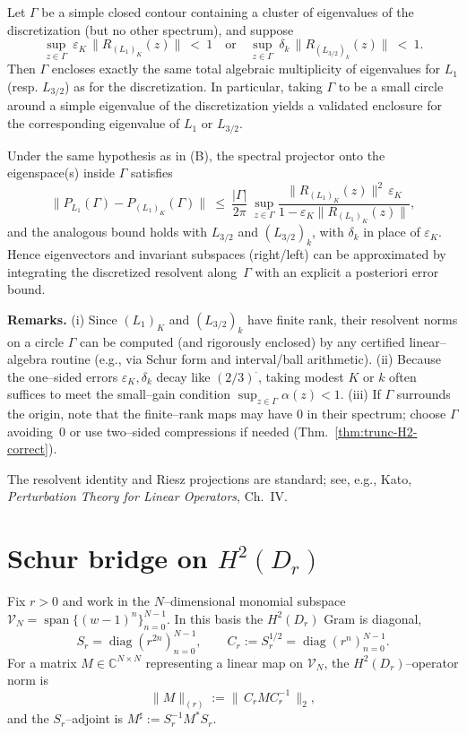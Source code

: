 \documentclass[11pt]{article}
\begin{document}
Let $\Gamma$ be a simple closed contour containing a cluster of eigenvalues of the
discretization (but no other spectrum), and suppose
\[
\sup_{z\in\Gamma}\ \varepsilon_{K}\,\bigl\|R_{(L_{1})_{K}}(z)\bigr\|\ <\ 1
\quad\text{or}\quad
\sup_{z\in\Gamma}\ \delta_{k}\,\bigl\|R_{(L_{3/2})_{k}}(z)\bigr\|\ <\ 1.
\]
Then $\Gamma$ encloses exactly the same total algebraic multiplicity of eigenvalues for
$L_{1}$ (resp. $L_{3/2}$) as for the discretization. In particular, taking $\Gamma$ to be a
small circle around a simple eigenvalue of the discretization yields a validated enclosure
for the corresponding eigenvalue of $L_{1}$ or $L_{3/2}$.

Under the same hypothesis as in (B), the spectral projector onto the
eigenspace(s) inside $\Gamma$ satisfies
\[
\|P_{L_{1}}(\Gamma)-P_{(L_{1})_{K}}(\Gamma)\|
\ \le\ \frac{|\Gamma|}{2\pi}\ \sup_{z\in\Gamma}
\frac{\|R_{(L_{1})_{K}}(z)\|^2\,\varepsilon_{K}}{1-\varepsilon_{K}\|R_{(L_{1})_{K}}(z)\|},
\]
and the analogous bound holds with $L_{3/2}$ and $(L_{3/2})_{k}$, with $\delta_k$ in place
of $\varepsilon_K$. Hence eigenvectors and invariant subspaces (right/left) can be
approximated by integrating the discretized resolvent along~$\Gamma$ with an explicit
a posteriori error bound.

\medskip
\noindent\textbf{Remarks.}
(i) Since $(L_{1})_{K}$ and $(L_{3/2})_{k}$ have finite rank, their resolvent norms on
a circle $\Gamma$ can be computed (and rigorously enclosed) by any certified linear–algebra
routine (e.g., via Schur form and interval/ball arithmetic).  
(ii) Because the one–sided errors $\varepsilon_K,\delta_k$ decay like $(2/3)^{\cdot}$,
taking modest $K$ or $k$ often suffices to meet the small–gain condition
$\sup_{z\in\Gamma}\alpha(z)<1$.  
(iii) If $\Gamma$ surrounds the origin, note that the finite–rank maps may have $0$ in
their spectrum; choose $\Gamma$ avoiding~$0$ or use two–sided compressions if needed
(Thm.~\ref{thm:trunc-H2-correct}).

The resolvent identity and Riesz projections are standard; see, e.g., Kato, \emph{Perturbation Theory for Linear Operators}, Ch.~IV.


\section{Schur bridge on \texorpdfstring{$H^2(D_r)$}{H2(Dr)}}
\label{sec:schur-H2r}

Fix $r>0$ and work in the $N$–dimensional monomial subspace
$\mathcal V_N=\operatorname{span}\{(w-1)^n\}_{n=0}^{N-1}$.
In this basis the $H^2(D_r)$ Gram is diagonal,
\[
S_r=\operatorname{diag}(r^{2n})_{n=0}^{N-1},\qquad
C_r:=S_r^{1/2}=\operatorname{diag}(r^{n})_{n=0}^{N-1}.
\]
For a matrix $M\in\mathbb{C}^{N\times N}$ representing a linear map on $\mathcal V_N$,
the $H^2(D_r)$–operator norm is
\begin{equation}\label{eq:Hr-norm}
\|M\|_{(r)}:=\|\,C_r M C_r^{-1}\,\|_2 ,
\end{equation}
and the $S_r$–adjoint is $M^\sharp := S_r^{-1} M^\ast S_r$.
\end{document}

